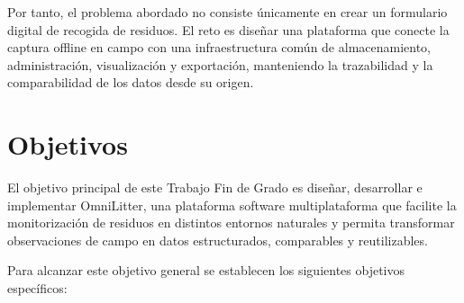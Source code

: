 Por tanto, el problema abordado no consiste únicamente en crear un formulario
digital de recogida de residuos. El reto es diseñar una plataforma que conecte la
captura offline en campo con una infraestructura común de almacenamiento,
administración, visualización y exportación, manteniendo la trazabilidad y la
comparabilidad de los datos desde su origen.

\section{Objetivos}

El objetivo principal de este Trabajo Fin de Grado es diseñar, desarrollar e
implementar OmniLitter, una plataforma software multiplataforma que facilite la
monitorización de residuos en distintos entornos naturales y permita transformar
observaciones de campo en datos estructurados, comparables y reutilizables.

Para alcanzar este objetivo general se establecen los siguientes objetivos
específicos:

